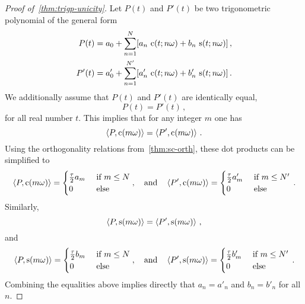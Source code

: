 \begin{proof}[Proof of~\cref{thm:trigp-unicity}]
  Let $P(t)$ and $P'(t)$ be two trigonometric polynomial of the general form
  \begin{align}
    P(t)&=a_0+\sum_{n=1}^N[a_n\,\operatorname{c}(t;n\omega)+b_n\,\operatorname{s}(t;n\omega)]\,,\\
    P'(t)&=a'_0+\sum_{n=1}^{N'}[a'_n\,\operatorname{c}(t;n\omega)+b'_n\,\operatorname{s}(t;n\omega)]\,.
  \end{align}
  We additionally assume that $P(t)$ and $P'(t)$ are identically equal, \ie
  \begin{equation}
    P(t)=P'(t)\,,
  \end{equation}
  for all real number $t$. This implies that for any integer $m$ one has
  \begin{equation}
    \braket{P,\operatorname{c}(m\omega)}=\braket{P',\operatorname{c}(m\omega)}\,.
  \end{equation}
  Using the orthogonality relations from~\cref{thm:sc-orth}, these dot products can be
  simplified to
  \begin{equation}
    \braket{P,\operatorname{c}(m\omega)}=
    \begin{cases}
      \frac{\tau}{2}a_m&~\text{if}~m\leq N\\
      0&~\text{else}
    \end{cases},
    \quad\text{and}\quad
    \braket{P',\operatorname{c}(m\omega)}=
    \begin{cases}
      \frac{\tau}{2}a'_m&~\text{if}~m\leq N'\\
      0&~\text{else}
    \end{cases}\,.
  \end{equation}
  Similarly,
  \begin{equation}
    \braket{P,\operatorname{s}(m\omega)}=\braket{P',\operatorname{s}(m\omega)}\,,
  \end{equation}
  and
  \begin{equation}
    \braket{P,\operatorname{s}(m\omega)}=
    \begin{cases}
      \frac{\tau}{2}b_m&~\text{if}~m\leq N\\
      0&~\text{else}
    \end{cases},
    \quad\text{and}\quad
    \braket{P',\operatorname{s}(m\omega)}=
    \begin{cases}
      \frac{\tau}{2}b'_m&~\text{if}~m\leq N'\\
      0&~\text{else}
    \end{cases}\,.
  \end{equation}
  Combining the equalities above implies directly that $a_n=a'_n$ and $b_n=b'_n$ for all
  $n$.
\end{proof}
